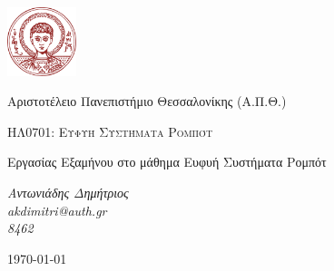 \begin{titlepage}
	\centering
	\includegraphics[width=0.15\textwidth]{./LogoAUTH.png}\par\vspace{1cm}
	{\huge  Αριστοτέλειο Πανεπιστήμιο Θεσσαλονίκης (Α.Π.Θ.) \par}
	\vspace{2cm}
	{\textsc{ ΗΛ0701: Ευφυή Συστήματα Ρομπότ }\par}
	\vspace{2cm}
	{\huge{} Εργασίας Εξαμήνου στο μάθημα Ευφυή Συστήματα Ρομπότ \par}
	\vspace{2cm}
	{\Large\itshape Αντωνιάδης Δημήτριος \\ \textlatin{akdimitri@auth.gr} \\ 8462\par}
	\vfill
	{\large {\today} \par}
\end{titlepage}
